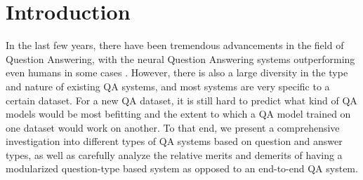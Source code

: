 


\section{Introduction}


In the last few years, there have been tremendous advancements in the field of Question Answering, with the neural Question Answering systems outperforming even humans in some cases \cite{msmarco}. However, there is also a large diversity in the type and nature of existing QA systems, and most systems are very specific to a certain dataset. For a new QA dataset, it is still hard to predict what kind of QA models would be most befitting and the extent to which a QA model trained on one dataset would work on another. To that end, we present a comprehensive investigation into different types of QA systems based on question and answer types, as well as carefully analyze the relative merits and demerits of having a modularized question-type based system as opposed to an end-to-end QA system. 

